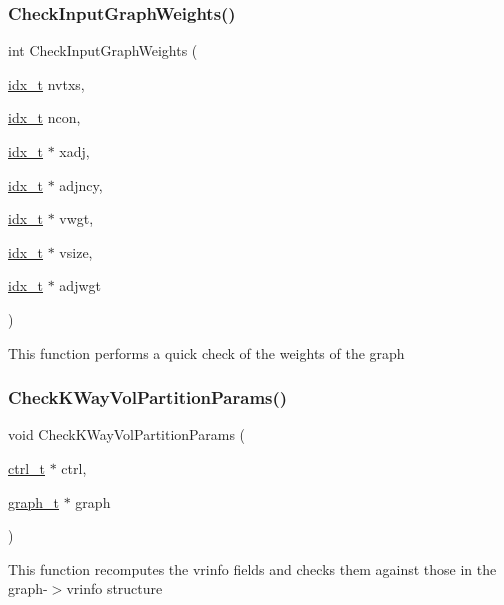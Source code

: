 \subsubsection{\texorpdfstring{Check\+Input\+Graph\+Weights()}{CheckInputGraphWeights()}}
{\footnotesize\ttfamily int Check\+Input\+Graph\+Weights (\begin{DoxyParamCaption}\item[{\hyperlink{a00876_aaa5262be3e700770163401acb0150f52}{idx\+\_\+t}}]{nvtxs,  }\item[{\hyperlink{a00876_aaa5262be3e700770163401acb0150f52}{idx\+\_\+t}}]{ncon,  }\item[{\hyperlink{a00876_aaa5262be3e700770163401acb0150f52}{idx\+\_\+t} $\ast$}]{xadj,  }\item[{\hyperlink{a00876_aaa5262be3e700770163401acb0150f52}{idx\+\_\+t} $\ast$}]{adjncy,  }\item[{\hyperlink{a00876_aaa5262be3e700770163401acb0150f52}{idx\+\_\+t} $\ast$}]{vwgt,  }\item[{\hyperlink{a00876_aaa5262be3e700770163401acb0150f52}{idx\+\_\+t} $\ast$}]{vsize,  }\item[{\hyperlink{a00876_aaa5262be3e700770163401acb0150f52}{idx\+\_\+t} $\ast$}]{adjwgt }\end{DoxyParamCaption})}

This function performs a quick check of the weights of the graph \mbox{\label{a00945_a70f506aae12b862f495f3dec9a8f4fc3}} 
\subsubsection{\texorpdfstring{Check\+K\+Way\+Vol\+Partition\+Params()}{CheckKWayVolPartitionParams()}}
{\footnotesize\ttfamily void Check\+K\+Way\+Vol\+Partition\+Params (\begin{DoxyParamCaption}\item[{\hyperlink{a00742}{ctrl\+\_\+t} $\ast$}]{ctrl,  }\item[{\hyperlink{a00734}{graph\+\_\+t} $\ast$}]{graph }\end{DoxyParamCaption})}

This function recomputes the vrinfo fields and checks them against those in the graph-\/$>$vrinfo structure \mbox{\label{a00945_ae7d4f14c32e15f9aeb0e284494da06c6}} 
